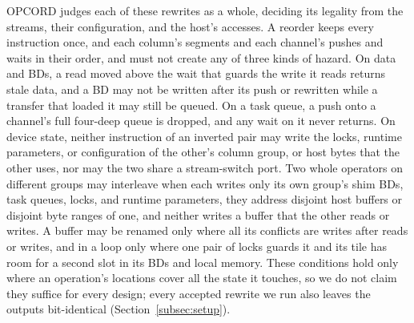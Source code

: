 OPCORD judges each of these rewrites as a whole, deciding its legality from the streams, their configuration, and the host's accesses.
A reorder keeps every instruction once, and each column's segments and each channel's pushes and waits in their order, and must not create any of three kinds of hazard.
On data and BDs, a read moved above the wait that guards the write it reads returns stale data, and a BD may not be written after its push or rewritten while a transfer that loaded it may still be queued.
On a task queue, a push onto a channel's full four-deep queue is dropped, and any wait on it never returns.
On device state, neither instruction of an inverted pair may write the locks, runtime parameters, or configuration of the other's column group, or host bytes that the other uses, nor may the two share a stream-switch port.
Two whole operators on different groups may interleave when each writes only its own group's shim BDs, task queues, locks, and runtime parameters, they address disjoint host buffers or disjoint byte ranges of one, and neither writes a buffer that the other reads or writes.
A buffer may be renamed only where all its conflicts are writes after reads or writes, and in a loop only where one pair of locks guards it and its tile has room for a second slot in its BDs and local memory.
These conditions hold only where an operation's locations cover all the state it touches, so we do not claim they suffice for every design; every accepted rewrite we run also leaves the outputs bit-identical (Section~\ref{subsec:setup}).

